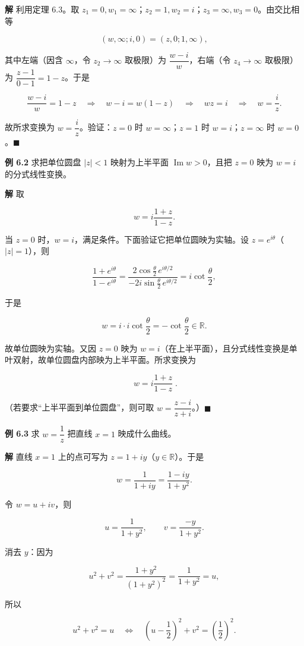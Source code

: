 \textbf{解} 利用定理 6.3。取
\(z_1=0,w_1=\infty\)；\(z_2=1,w_2=i\)；\(z_3=\infty,w_3=0\)。由交比相等

\[
(w,\infty;i,0)=(z,0;1,\infty),
\]

其中左端（因含 \(\infty\)，令 \(z_2\to\infty\) 取极限）为
\(\dfrac{w-i}{w}\)，右端（令 \(z_4\to\infty\) 取极限）为
\(\dfrac{z-1}{0-1}=1-z\)。于是

\[
\frac{w-i}{w}=1-z
\quad\Longrightarrow\quad
w-i=w(1-z)
\quad\Longrightarrow\quad
wz=i
\quad\Longrightarrow\quad
w=\frac{i}{z}.
\]

故所求变换为 \(w=\dfrac{i}{z}\)。验证：\(z=0\) 时 \(w=\infty\)；\(z=1\)
时 \(w=i\)；\(z=\infty\) 时 \(w=0\)。\(\blacksquare\)

\textbf{例 6.2} 求把单位圆盘 \(|z|<1\) 映射为上半平面
\(\operatorname{Im}w>0\)，且把 \(z=0\) 映为 \(w=i\) 的分式线性变换。

\textbf{解} 取

\[
w = i\frac{1+z}{1-z}.
\]

当 \(z=0\) 时，\(w=i\)，满足条件。下面验证它把单位圆映为实轴。设
\(z=e^{i\theta}\)（\(|z|=1\)），则

\[
\frac{1+e^{i\theta}}{1-e^{i\theta}}
= \frac{2\cos\frac{\theta}{2}\,e^{i\theta/2}}
{-2i\sin\frac{\theta}{2}\,e^{i\theta/2}}
= i\cot\frac{\theta}{2},
\]

于是

\[
w = i\cdot i\cot\frac{\theta}{2} = -\cot\frac{\theta}{2}\in \mathbb{R}.
\]

故单位圆映为实轴。又因 \(z=0\) 映为
\(w=i\)（在上半平面），且分式线性变换是单叶双射，故单位圆盘内部映为上半平面。所求变换为

\[
\boxed{\;w=i\frac{1+z}{1-z}\;}.
\]

（若要求``上半平面到单位圆盘''，则可取
\(w=\dfrac{z-i}{z+i}\)。）\(\blacksquare\)

\textbf{例 6.3} 求 \(w=\dfrac{1}{z}\) 把直线 \(x=1\) 映成什么曲线。

\textbf{解} 直线 \(x=1\) 上的点可写为
\(z=1+iy\)（\(y\in\mathbb{R}\)）。于是

\[
w=\frac{1}{1+iy}=\frac{1-iy}{1+y^2}.
\]

令 \(w=u+iv\)，则

\[
u=\frac{1}{1+y^2},\qquad v=\frac{-y}{1+y^2}.
\]

消去 \(y\)：因为

\[
u^2+v^2=\frac{1+y^2}{(1+y^2)^2}=\frac{1}{1+y^2}=u,
\]

所以

\[
u^2+v^2=u
\quad\Longleftrightarrow\quad
\left(u-\frac12\right)^{2}+v^{2}=\left(\frac12\right)^{2}.
\]

